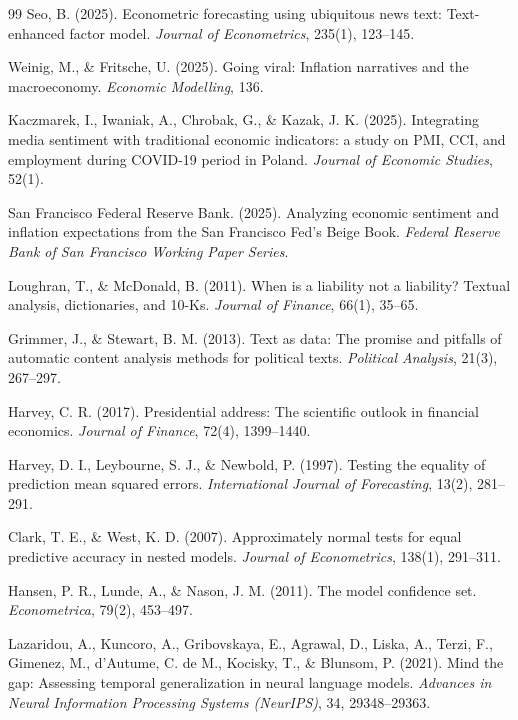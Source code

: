 \documentclass[11pt]{article}
\begin{document}
\begin{thebibliography}{99}
 Seo, B. (2025). Econometric forecasting using ubiquitous news text: Text-enhanced factor model. \textit{Journal of Econometrics}, 235(1), 123--145.

 Weinig, M., \& Fritsche, U. (2025). Going viral: Inflation narratives and the macroeconomy. \textit{Economic Modelling}, 136.

 Kaczmarek, I., Iwaniak, A., Chrobak, G., \& Kazak, J. K. (2025). Integrating media sentiment with traditional economic indicators: a study on PMI, CCI, and employment during COVID-19 period in Poland. \textit{Journal of Economic Studies}, 52(1).

 San Francisco Federal Reserve Bank. (2025). Analyzing economic sentiment and inflation expectations from the San Francisco Fed's Beige Book. \textit{Federal Reserve Bank of San Francisco Working Paper Series}.

 Loughran, T., \& McDonald, B. (2011). When is a liability not a liability? Textual analysis, dictionaries, and 10-Ks. \textit{Journal of Finance}, 66(1), 35--65.

 Grimmer, J., \& Stewart, B. M. (2013). Text as data: The promise and pitfalls of automatic content analysis methods for political texts. \textit{Political Analysis}, 21(3), 267--297.

 Harvey, C. R. (2017). Presidential address: The scientific outlook in financial economics. \textit{Journal of Finance}, 72(4), 1399--1440.

 Harvey, D. I., Leybourne, S. J., \& Newbold, P. (1997). Testing the equality of prediction mean squared errors. \textit{International Journal of Forecasting}, 13(2), 281--291.

 Clark, T. E., \& West, K. D. (2007). Approximately normal tests for equal predictive accuracy in nested models. \textit{Journal of Econometrics}, 138(1), 291--311.

 Hansen, P. R., Lunde, A., \& Nason, J. M. (2011). The model confidence set. \textit{Econometrica}, 79(2), 453--497.

 Lazaridou, A., Kuncoro, A., Gribovskaya, E., Agrawal, D., Liska, A., Terzi, F., Gimenez, M., d'Autume, C. de M., Kocisky, T., \& Blunsom, P. (2021). Mind the gap: Assessing temporal generalization in neural language models. \textit{Advances in Neural Information Processing Systems (NeurIPS)}, 34, 29348--29363.


\end{thebibliography}
\end{document}
